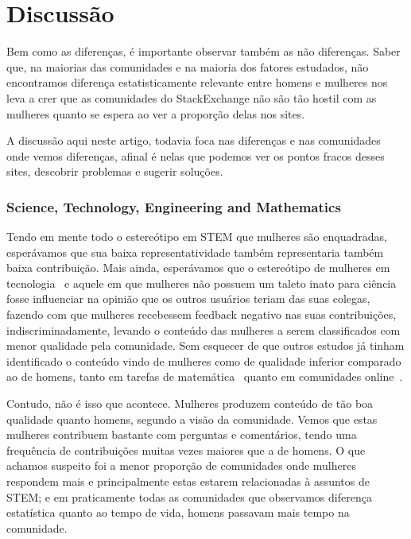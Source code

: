 \chapter{Discussão}

Bem como as diferenças, é importante observar também as não diferenças. Saber que, na maiorias das comunidades e na maioria dos fatores estudados, não encontramos diferença estatisticamente relevante entre homens e mulheres nos leva a crer que as comunidades do StackExchange não são tão hostil com as mulheres quanto se espera ao ver a proporção delas nos sites. 

A discussão aqui neste artigo, todavia foca nas diferenças e nas comunidades onde vemos diferenças, afinal é nelas que podemos ver os pontos fracos desses sites, descobrir problemas e sugerir soluções.

\subsection{Science, Technology, Engineering and Mathematics}

Tendo em mente todo o estereótipo em STEM que mulheres são enquadradas, esperávamos que sua baixa representatividade também representaria também baixa contribuição. Mais ainda, esperávamos que o estereótipo de mulheres em tecnologia~\cite{hyde1990gender} e aquele em que mulheres não possuem um taleto inato para ciência~\cite{} fosse influenciar na opinião que os outros usuários teriam das suas colegas, fazendo com que mulheres recebessem feedback negativo nas suas contribuições, indiscriminadamente, levando o conteúdo das mulheres a serem classificados com menor qualidade pela comunidade. Sem esquecer de que outros estudos já tinham identificado o conteúdo vindo de mulheres como de qualidade inferior comparado ao de homens, tanto em tarefas de matemática~\cite{campbell1986effects} quanto em comunidades online~\cite{collier2012conflict}.

Contudo, não é isso que acontece. Mulheres produzem conteúdo de tão boa qualidade quanto homens, segundo a visão da comunidade. Vemos que estas mulheres contribuem bastante com perguntas e comentários, tendo uma frequência de contribuições muitas vezes maiores que a de homens. O que achamos suspeito foi a menor proporção de comunidades onde mulheres respondem mais e principalmente estas estarem relacionadas à assuntos de STEM; e em praticamente todas as comunidades que observamos diferença estatística quanto ao tempo de vida, homens passavam mais tempo na comunidade.

